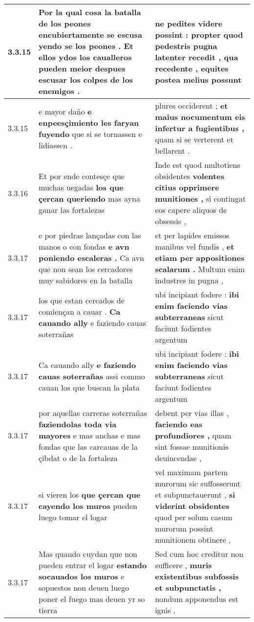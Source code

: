 \begin{tabular}{|p{1cm}|p{6.5cm}|p{6.5cm}|}
3.3.15 & Por la qual cosa la batalla de los peones \textbf{ encubiertamente se escusa yendo se los peones . } Et ellos ydos los caualleros pueden meior despues escusar los colpes de los enemigos . & ne pedites videre possint : \textbf{ propter quod pedestris pugna latenter recedit , } qua recedente , equites postea melius possunt \\\hline
3.3.15 & e mayor daño \textbf{ e enpeesçimiento les faryan fuyendo } que si se tornassen e lidiassen . & plures occiderent ; \textbf{ et maius nocumentum eis infertur a fugientibus , } quam si se verterent et bellarent . \\\hline
3.3.16 & Et por ende contesçe que muchas uegadas \textbf{ los que çercan queriendo } mas ayna ganar las fortalezas & Inde est quod multotiens obsidentes \textbf{ volentes citius opprimere munitiones , } si contingat eos capere aliquos de obsessis , \\\hline
3.3.17 & e por piedras lançadas con las manos o con fondas \textbf{ e avn poniendo escaleras . } Ca avn que non sean los cercadores muy sabidores en la batalla & et per lapides emissos manibus vel fundis , \textbf{ et etiam per appositiones scalarum . } Multum enim industres in pugna , \\\hline
3.3.17 & los que estan cercados de comiençan a cauar . \textbf{ Ca cauando ally } e faziendo cauas soterrañas & ubi incipiant fodere : \textbf{ ibi enim faciendo vias subterraneas } sicut faciunt fodientes argentum \\\hline
3.3.17 & Ca cauando ally \textbf{ e faziendo cauas soterrañas } assi commo cauan los que buscan la plata & ubi incipiant fodere : \textbf{ ibi enim faciendo vias subterraneas } sicut faciunt fodientes argentum \\\hline
3.3.17 & por aquellas carreras soterrañas \textbf{ faziendolas toda via mayores } e mas anchas e mas fondas que las carcauas de la çibdat o de la fortaleza & debent per vias illas , \textbf{ faciendo eas profundiores , } quam sint fossae munitionis deuincendae , \\\hline
3.3.17 & si vieren los \textbf{ que çercan que cayendo los muros } pueden luego tomar el logar & vel maximam partem murorum sic suffosserunt et subpunctauerunt , \textbf{ si viderint obsidentes } quod per solum casum murorum possint munitionem obtinere , \\\hline
3.3.17 & Mas quando cuydan que non pueden entrar el logar \textbf{ estando socauados los muros } e sopuestos non deuen luego poner el fuego mas deuen yr so tierra & Sed cum hoc creditur non sufficere , \textbf{ muris existentibus subfossis et subpunctatis , } nondum apponendus est ignis , \\\hline

\end{tabular}
